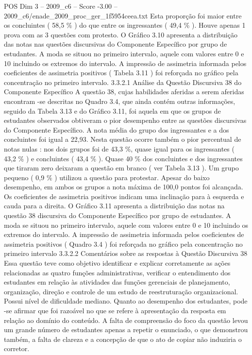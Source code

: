 \begin{textsample}{POS Dim 3 – 2009\_c6 – Score -3.00 – 2009\_c6/enade\_2009\_proc\_ger\_1f5954ceea.txt}
Esta proporção foi maior entre os concluintes ( 58,5 \% ) do que entre os ingressantes ( 49,4 \% ).
Houve apenas 1 prova com as 3 questões com protesto.
O Gráfico 3.10 apresenta a distribuição das notas nas questões discursivas do Componente Específico por grupo de estudantes.
A moda se situou no primeiro intervalo, aquele com valores entre 0 e 10 incluindo os extremos do intervalo.
A impressão de assimetria informada pelos coeficientes de assimetria positivos ( Tabela 3.11 ) foi reforçada no gráfico pela concentração no primeiro intervalo. 3.3.2.1 Análise da Questão Discursiva 38 do Componente Específico A questão 38, cujas habilidades aferidas a serem aferidas encontram -se descritas no Quadro 3.4, que ainda contém outras informações, seguido da Tabela 3.13 e do Gráfico 3.11, foi aquela em que os grupos de estudantes observados obtiveram o pior desempenho entre as questões discursivas do Componente Específico.
A nota média do grupo dos ingressantes e a dos concluintes foi igual a 22,93.
Nesta questão ocorre também o pior percentual de notas nulas : nos dois grupos foi de 43,3 \%, quase igual para os ingressantes ( 43,2 \% ) e concluintes ( 43,4 \% ).
Quase 40 \% dos concluintes e dos ingressantes que tiraram zero deixaram a questão em branco ( ver Tabela 3.13 ).
Um grupo pequeno ( 0,9 \% ) utilizou a questão para protestar.
Apesar do baixo desempenho, em ambos os grupos a nota máxima de 100,0 pontos foi alcançada.
Os coeficientes de assimetria positivos indicam uma inclinação para à esquerda e cauda para a direita.
O Gráfico 3.11 apresenta a distribuição das notas na questão 38 discursiva do Componente Específico por grupo de estudantes.
A moda se situou no primeiro intervalo, aquele com valores entre 0 e 10 incluindo os extremos do intervalo.
A impressão de assimetria informada pelos coeficientes de assimetria positivos ( Quadro 3.4 ) foi reforçada no gráfico pela concentração no primeiro intervalo 3.3.2.2 Comentários sobre as respostas à Questão Discursiva 38 Essa questão teve como objetivo identificar e explicar corretamente as ações relacionadas as quatro funções administrativas, verificar o entendimento dos estudantes em relação às atividades das funções gerenciais de planejamento, organização, direção e controle de um estudo de reestruturação organizacional.
Possui nível de dificuldade mediano.
Quanto ao desempenho dos estudantes, pode -se afirmar que foi razoável no que se refere à apresentação da resposta em relação ao domínio do conteúdo.
A falta de compreensão do foco da questão levou um grande número de estudantes apenas a repetir o enunciado, o que demonstrou também, a falta de clareza e a concepção de que o ato de copiar não induziria o corretor.

\end{textsample}
